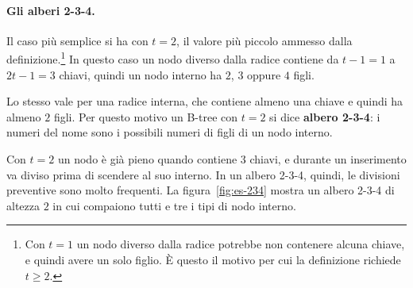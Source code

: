 \paragraph{Gli alberi 2-3-4.}
Il caso più semplice si ha con $t = 2$, il valore più piccolo ammesso dalla definizione.\footnote{Con $t = 1$ un nodo diverso dalla radice potrebbe non contenere alcuna chiave, e quindi avere un solo figlio. È questo il motivo per cui la definizione richiede $t \ge 2$.} In questo caso un nodo diverso dalla radice contiene da $t-1 = 1$ a $2t-1 = 3$ chiavi, quindi un nodo interno ha $2$, $3$ oppure $4$ figli.

Lo stesso vale per una radice interna, che contiene almeno una chiave e quindi ha almeno $2$ figli. Per questo motivo un B-tree con $t = 2$ si dice \textbf{albero 2-3-4}: i numeri del nome sono i possibili numeri di figli di un nodo interno.

Con $t = 2$ un nodo è già pieno quando contiene $3$ chiavi, e durante un inserimento va diviso prima di scendere al suo interno. In un albero 2-3-4, quindi, le divisioni preventive sono molto frequenti. La figura~\ref{fig:es-234} mostra un albero 2-3-4 di altezza $2$ in cui compaiono tutti e tre i tipi di nodo interno.


